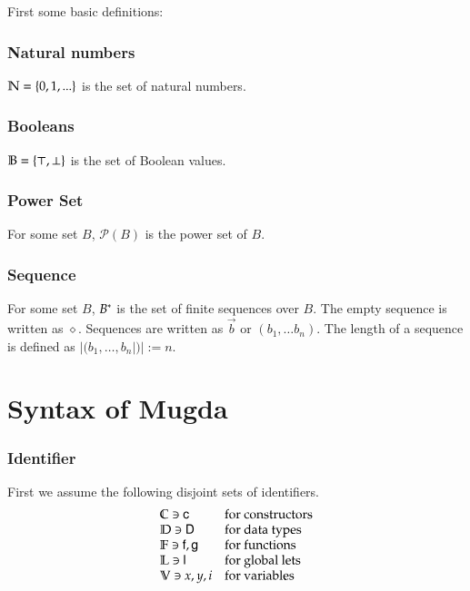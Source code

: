 \newcommand{\pset}[1]{\mathcal{P}(#1)}

\noindent First some basic definitions:
\subsubsection{Natural numbers}
$ \mathbb{N} = \{ 0 , 1 , ... \} $ is the set of natural numbers.
\subsubsection{Booleans}
$ \mathbb{B} = \{ \top, \bot \} $ is the set of Boolean values.
\subsubsection{Power Set}
For some set $B$, $\pset{B}$ is the power set of $B$.
\subsubsection{Sequence}
For some set $B$, ${B}^{\ast}$ is the set of finite sequences over $B$.
The empty sequence is written as $\diamond$.
Sequences are written as $\vec{b}$ or $(b_1, \ldots b_n)$.
The length of a sequence is defined as $|(b_1,\ldots, b_n|)| := n $. 
\section{Syntax of Mugda}

\subsubsection{Identifier}
First we assume the following disjoint sets of identifiers.
\[
\begin{array}{ll}
\mathbb{C} \ni \mathsf{c} & \mbox{for constructors}\\
\mathbb{D} \ni \mathsf{D} & \mbox{for data types}\\
\mathbb{F} \ni \mathsf{f} , \mathsf{g} & \mbox{for functions}\\
\mathbb{L} \ni \mathsf{l} & \mbox{for global lets}\\
\mathbb{V} \ni x,y,i & \mbox{for variables}
\end{array}
\]

